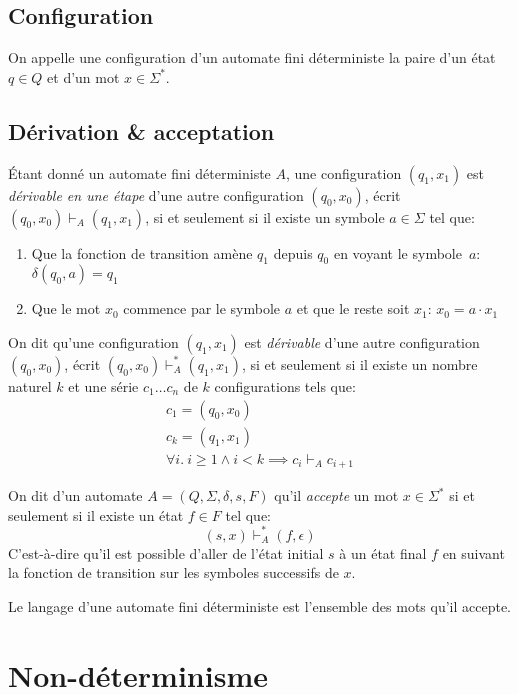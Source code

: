 \subsection{Configuration}

On appelle une \og configuration \fg{} d'un automate fini déterministe la paire d'un état $q \in Q$ et d'un mot $x \in \Sigma^*$.

\subsection{Dérivation \& acceptation}

Étant donné un automate fini déterministe $A$, une configuration $(q_1, x_1)$ est \og \textit{dérivable en une étape} \fg{} d'une autre configuration $(q_0, x_0)$, écrit $(q_0, x_0) \vdash_A (q_1, x_1)$, si et seulement si il existe un symbole $a \in \Sigma$ tel que:
\begin{enumerate}
\item Que la fonction de transition amène $q_1$ depuis $q_0$ en voyant le symbole~$a$: $\delta(q_0, a) = q_1$
\item Que le mot $x_0$ commence par le symbole $a$ et que le reste soit $x_1$: $x_0 = a \cdot x_1$
\end{enumerate}

On dit qu'une configuration $(q_1, x_1)$ est \og \textit{dérivable} \fg{} d'une autre configuration $(q_0, x_0)$, écrit $(q_0, x_0) \vdash_A^* (q_1, x_1)$, si et seulement si il existe un nombre naturel $k$ et une série $c_1 \dots c_n$ de $k$ configurations tels que:
\begin{gather*}
c_1 = (q_0, x_0)\\
c_k = (q_1, x_1)\\
\forall i.\ i \geq 1 \wedge i < k \implies c_i \vdash_A c_{i + 1}
\end{gather*}

On dit d'un automate $A = (Q, \Sigma, \delta, s, F)$ qu'il \og \textit{accepte} \fg{} un mot $x \in \Sigma^*$ si et seulement si il existe un état $f \in F$ tel que:
\[
(s, x) \vdash_A^* (f, \epsilon)
\]
C'est-à-dire qu'il est possible d'aller de l'état initial $s$ à un état final $f$ en suivant la fonction de transition sur les symboles successifs de $x$.

Le langage d'une automate fini déterministe est l'ensemble des mots qu'il accepte.

\section{Non-déterminisme}

